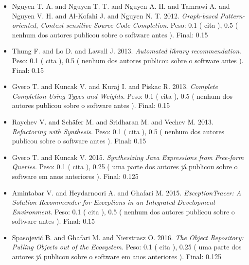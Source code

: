 \begin{itemize}
\item Nguyen T. A. and Nguyen T. T. and Nguyen A. H. and Tamrawi A. and Nguyen V. H. and Al-Kofahi J. and Nguyen N. T.
      2012.
        \textit{ Graph-based Pattern-oriented, Context-sensitive Source Code Completion}.
      Peso:
      0.1 (
          cita
      ),
      0.5 (
nenhum dos autores publicou sobre o software antes
      ).
      Final:
      0.15

\item Thung F. and Lo D. and Lawall J.
      2013.
        \textit{ Automated library recommendation}.
      Peso:
      0.1 (
          cita
      ),
      0.5 (
nenhum dos autores publicou sobre o software antes
      ).
      Final:
      0.15

\item Gvero T. and Kuncak V. and Kuraj I. and Piskac R.
      2013.
        \textit{ Complete Completion Using Types and Weights}.
      Peso:
      0.1 (
          cita
      ),
      0.5 (
nenhum dos autores publicou sobre o software antes
      ).
      Final:
      0.15

\item Raychev V. and Sch\"{a}fer M. and Sridharan M. and Vechev M.
      2013.
        \textit{ Refactoring with Synthesis}.
      Peso:
      0.1 (
          cita
      ),
      0.5 (
nenhum dos autores publicou sobre o software antes
      ).
      Final:
      0.15

\item Gvero T. and Kuncak V.
      2015.
        \textit{ Synthesizing Java Expressions from Free-form Queries}.
      Peso:
      0.1 (
          cita
      ),
      0.25 (
uma parte dos autores já publicou sobre o software em anos anteriores
      ).
      Final:
      0.125

\item Amintabar V. and Heydarnoori A. and Ghafari M.
      2015.
        \textit{ ExceptionTracer: A Solution Recommender for Exceptions in an Integrated Development Environment}.
      Peso:
      0.1 (
          cita
      ),
      0.5 (
nenhum dos autores publicou sobre o software antes
      ).
      Final:
      0.15

\item Spasojevi\'{c} B. and Ghafari M. and Nierstrasz O.
      2016.
        \textit{ The Object Repository: Pulling Objects out of the Ecosystem}.
      Peso:
      0.1 (
          cita
      ),
      0.25 (
uma parte dos autores já publicou sobre o software em anos anteriores
      ).
      Final:
      0.125


\end{itemize}
